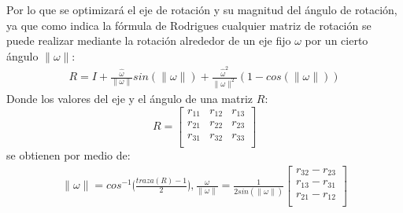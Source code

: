        	Por lo que se optimizará el eje de rotación y su magnitud del ángulo de rotación, ya que como indica la fórmula de Rodrigues cualquier matriz de rotación se puede realizar mediante la rotación alrededor de un eje fijo $\omega$ por un cierto ángulo $\parallel\omega\parallel$:
       	\begin{eqnarray}
       	R=I+\frac{\hat{\omega}}{\parallel\omega\parallel}sin(\parallel\omega\parallel)+ \frac{\hat{\omega}^2}{\parallel\omega\parallel^2}(1-cos(\parallel\omega\parallel))
       	\end{eqnarray}
       	Donde los valores del eje y el ángulo de una matriz $R$:
       	\[R=
       	\begin{bmatrix}
       	r_{11} & r_{12} & r_{13}\\
       	r_{21} & r_{22} & r_{23}\\
       	r_{31} & r_{32} & r_{33}\\
       	\end{bmatrix}
       	\]
       	se obtienen por medio de:
       	\begin{eqnarray}
       	\parallel\omega\parallel=cos^{-1}  \lgroup \frac{traza(R)-1}{2}\rgroup, \frac{\omega}{\parallel\omega\parallel}=\frac{1}{2sin(\parallel\omega\parallel)} \begin{bmatrix}
       	r_{32}-r_{23}\\
       	r_{13}-r_{31}\\
       	r_{21}-r_{12} \\
       	\end{bmatrix}	
       	\end{eqnarray}
       	
